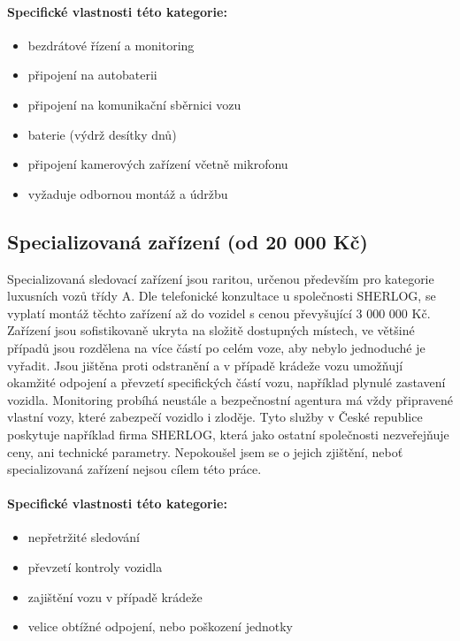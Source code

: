 \documentclass[FM,MP]{tulthesis}  %
\begin{document}
\paragraph{Specifické vlastnosti této kategorie:}
\begin{itemize}
\item bezdrátové řízení a monitoring
\item připojení na autobaterii
\item připojení na komunikační sběrnici vozu
\item baterie (výdrž desítky dnů)
\item připojení kamerových zařízení včetně mikrofonu
\item vyžaduje odbornou montáž a údržbu
\end{itemize}

\subsection{Specializovaná zařízení (od 20 000 Kč)}
Specializovaná sledovací zařízení jsou raritou, určenou především pro kategorie luxusních vozů třídy A. Dle telefonické konzultace u společnosti SHERLOG, se vyplatí montáž těchto zařízení až do vozidel s cenou převyšující 3 000 000 Kč. Zařízení jsou sofistikovaně ukryta na složitě dostupných místech, ve většiné případů jsou rozdělena na více částí po celém voze, aby nebylo jednoduché je vyřadit. Jsou jištěna proti odstranění a v případě krádeže vozu umožňují okamžité odpojení a převzetí specifických částí vozu, například plynulé zastavení vozidla. Monitoring probíhá neustále a bezpečnostní agentura má vždy připravené vlastní vozy, které zabezpečí vozidlo i zloděje. Tyto služby v České republice poskytuje například firma SHERLOG, která jako ostatní společnosti nezveřejňuje ceny, ani technické parametry. Nepokoušel jsem se o jejich zjištění, neboť specializovaná zařízení nejsou cílem této práce. 

\paragraph{Specifické vlastnosti této kategorie:}
\begin{itemize}
\item nepřetržité sledování
\item převzetí kontroly vozidla
\item zajištění vozu v případě krádeže
\item velice obtížné odpojení, nebo poškození jednotky
\end{itemize}
\end{document}
